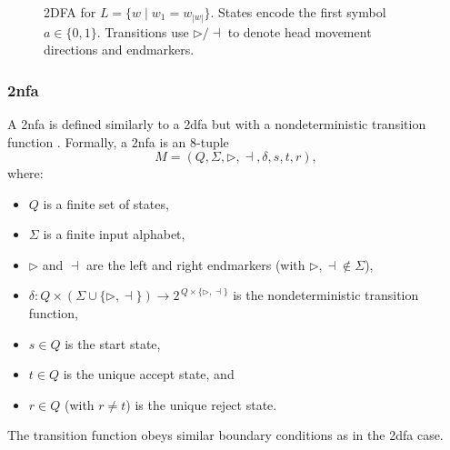\begin{figure}[h]
    \centering  
    \caption{2DFA for \(L = \{w \mid w_1 = w_{|w|}\}\). States encode the first symbol \(a \in \{0,1\}\). Transitions use \(\triangleright/\dashv\) to denote head movement directions and endmarkers.}
    \label{fig:2dfa-example}
\end{figure}


\subsubsection{\acrfull{2nfa}}
\label{subsubsec:2nfa}

\begin{definition}
A \gls{2nfa} is defined similarly to a \gls{2dfa} but with a nondeterministic transition function \cite{sakoda1978nfas}. Formally, a \gls{2nfa} is an 8-tuple
\[
M = (Q, \Sigma, \triangleright, \dashv, \delta, s, t, r),
\]
where:
\begin{itemize}
    \item \(Q\) is a finite set of states,
    \item \(\Sigma\) is a finite input alphabet,
    \item \(\triangleright\) and \(\dashv\) are the left and right endmarkers (with \(\triangleright,\dashv \notin \Sigma\)),
    \item \(\delta: Q \times (\Sigma \cup \{\triangleright,\dashv\}) \to 2^{\,Q \times \{\triangleright,\dashv\}}\) is the nondeterministic transition function,
    \item \(s\in Q\) is the start state,
    \item \(t\in Q\) is the unique accept state, and
    \item \(r\in Q\) (with \(r\neq t\)) is the unique reject state.
\end{itemize}
The transition function obeys similar boundary conditions as in the \gls{2dfa} case.
\end{definition}

